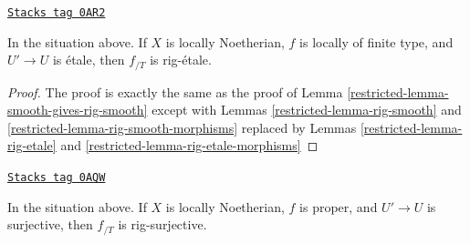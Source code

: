 \begin{lemma}
\label{restricted-lemma-etale-gives-rig-etale}
\href{https://stacks.math.columbia.edu/tag/0AR2}{\texttt{Stacks tag 0AR2}}

In the situation above. If $X$ is locally Noetherian,
$f$ is locally of finite type, and $U' \to U$ is \'etale, then
$f_{/T}$ is rig-\'etale.
\end{lemma}

\begin{proof}

The proof is exactly the same as the proof of
Lemma \ref{restricted-lemma-smooth-gives-rig-smooth} except with
Lemmas \ref{restricted-lemma-rig-smooth} and \ref{restricted-lemma-rig-smooth-morphisms}
replaced by
Lemmas \ref{restricted-lemma-rig-etale} and \ref{restricted-lemma-rig-etale-morphisms}
\end{proof}

\begin{lemma}
\label{restricted-lemma-completion-proper-surjective-rig-surjective}
\href{https://stacks.math.columbia.edu/tag/0AQW}{\texttt{Stacks tag 0AQW}}

In the situation above. If $X$ is locally Noetherian,
$f$ is proper, and $U' \to U$ is surjective, then $f_{/T}$ is rig-surjective.
\end{lemma}

